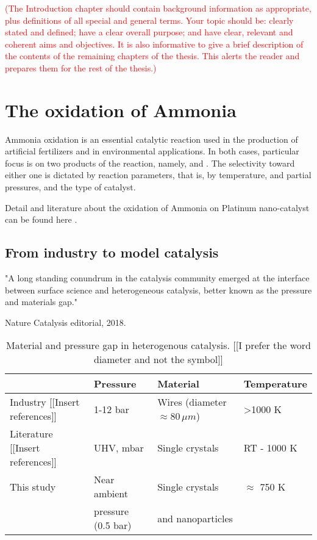 \textcolor{red}{(The Introduction chapter should contain background information as appropriate, plus definitions of all special and general terms. Your topic should be: clearly stated and defined; have a clear overall purpose; and have clear, relevant and coherent aims and objectives. It is also informative to give a brief description of the contents of the remaining chapters of the thesis. This alerts the reader and prepares them for the rest of the thesis.)}

\section{The oxidation of Ammonia}

Ammonia oxidation is an essential catalytic reaction used in the production of artificial fertilizers and in environmental applications. In both cases, particular focus is on two products of the reaction, namely, \nitricoxide and \nitrogen. The selectivity toward either one is dictated by reaction parameters, that is, by temperature, \ammonia and \dioxygen partial pressures, and the type of catalyst.

Detail and literature about the oxidation of Ammonia on Platinum nano-catalyst can be found here \parencite{Resta2020a}.

\subsection{From industry to model catalysis}

"A long standing conundrum in the catalysis community emerged at the interface between surface science and heterogeneous catalysis, better known as the pressure and materials gap."

Nature Catalysis editorial, 2018.

\begin{table}[!htb]
    \centering
    \begin{tabular}{l|l|l|l}
    \toprule
                & Pressure    & Material       &     Temperature \\
    \midrule
    Industry {\color{DarkOrange}[[Insert references]]}  & 1-12 bar & Wires (diameter $\approx 80 \, \mu m$) & \textgreater 1000 K \\
    \midrule
    Literature {\color{DarkOrange}[[Insert references]]} & UHV, mbar & Single crystals & RT - 1000 K \\ \midrule
    This study & Near ambient    & Single crystals  & $\approx$ 750 K \\
               & pressure (0.5 bar)  & and nanoparticles & \\
    \bottomrule
    \end{tabular}
    \caption{Material and pressure gap in heterogenous catalysis. {\color{DarkOrange}[[I prefer the word diameter and not the symbol]]}}
    \label{tab:gap}
\end{table}

